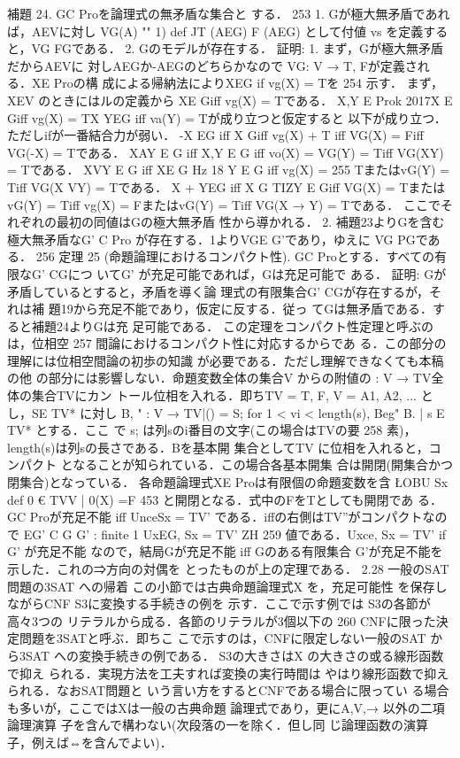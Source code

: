 \documentclass{ltjsarticle}
\theoremstyle{mystyle1}
\theoremstyle{mystyle2}
\begin{document}
補題 24. GC Proを論理式の無矛盾な集合と
する．
253
1. Gが極大無矛盾であれば，AEVに対し
VG(A) ""
1) def JT (AEG)
F (AEG) として付値 vs を定義すると，VG FGである． 2. Gのモデルが存在する．
証明: 1. まず，Gが極大無矛盾だからAEVに 対しAEGか-AEGのどちらかなので VG: V → {T, F}が定義される．XE Proの構 成による帰納法によりXEG if vg(X) = Tを
254
示す． まず，XEV のときにはルの定義から XE Giff vg(X) = Tである．
X,Y E Prok 2017X E Giff vg(X) = TX YEG iff va(Y) = Tが成り立つと仮定すると 以下が成り立つ．ただしifが一番結合力が弱い． -X EG iff X  Giff vg(X) + T iff VG(X) = Fiff VG(-X) = Tである． XAY E G iff X,Y E G iff vo(X) = VG(Y) = Tiff VG(XY) = Tである． XVY E G iff XE G Hz 18 Y E G iff vg(X) =
255
TまたはvG(Y) = Tiff VG(X VY) = Tである． X + YEG iff X   G TIZY E Giff VG(X) = TまたはvG(Y) = Tiff vg(X) = FまたはvG(Y) = Tiff VG(X → Y) = Tである． ここでそれぞれの最初の同値はGの極大無矛盾 性から導かれる． 2. 補題23よりGを含む極大無矛盾なG' C Pro が存在する．1よりVGE G'であり，ゆえに VG PGである．
256
定理 25 (命題論理におけるコンパクト性). GC Proとする．すべての有限なG' CGにつ いてG' が充足可能であれば，Gは充足可能で ある．
証明: Gが矛盾しているとすると，矛盾を導く論 理式の有限集合G' CGが存在するが，それは補 題19から充足不能であり，仮定に反する．従っ てGは無矛盾である．すると補題24よりGは充 足可能である．
この定理をコンパクト性定理と呼ぶのは，位相空
257
間論におけるコンパクト性に対応するからであ る．この部分の理解には位相空間論の初歩の知識 が必要である．ただし理解できなくても本稿の他 の部分には影響しない．命題変数全体の集合V からの附値の : V → TV全体の集合TVにカン トール位相を入れる．即ちTV = {T, F}, V = {A1, A2, ... } とし，SE TV* に対し B, " { : V → TV|() = S; for 1 < vi < length(s)}, Beg" {B. | s E TV*} とする．ここ
で s; は列sのi番目の文字(この場合はTVの要
258
素)，length(s)は列sの長さである．Bを基本開 集合としてTV に位相を入れると，コンパクト となることが知られている．この場合各基本開集 合は開閉(開集合かつ閉集合)となっている． 各命題論理式XE Proは有限個の命題変数を含 ŁOBU Sx def {0 € TVV | 0(X) =F} 453 と開閉となる．式中のFをTとしても開閉であ る．GC Proが充足不能 iff UnceSx = TV' である．iffの右側はTV”がコンパクトなので EG' C G G' : finite 1 UxEG, Sx = TV' ZH
259
値である．Uxce, Sx = TV' if G' が充足不能 なので，結局Gが充足不能 iff Gのある有限集合 G'が充足不能を示した．これの⇒方向の対偶を とったものが上の定理である．
2.28 一般のSAT問題の3SAT への帰着
この小節では古典命題論理式X を，充足可能性 を保存しながらCNF S3に変換する手続きの例を 示す．ここで示す例では S3の各節が高々3つの リテラルから成る．各節のリテラルが3個以下の
260
CNFに限った決定問題を3SATと呼ぶ．即ちこ こで示すのは，CNFに限定しない一般のSAT か ら3SAT への変換手続きの例である． S3の大きさはX の大きさの或る線形函数で抑え られる．実現方法を工夫すれば変換の実行時間は やはり線形函数で抑えられる．なおSAT問題と いう言い方をするとCNFである場合に限ってい る場合も多いが，ここではXは一般の古典命題 論理式であり，更にA,V,→ 以外の二項論理演算 子を含んで構わない(次段落の一を除く．但し同 じ論理函数の演算子，例えば⇔を含んでよい)．
\end{document}
